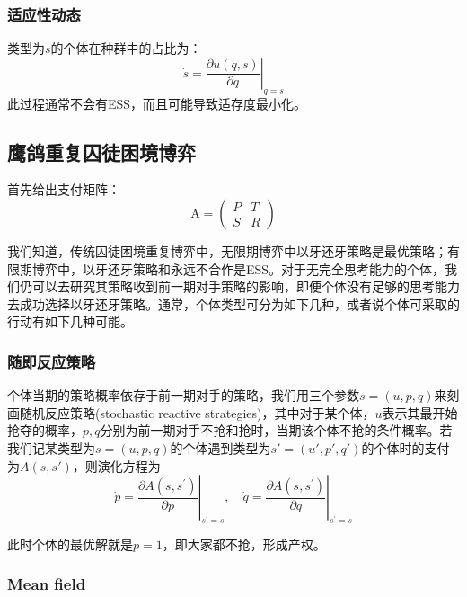 \documentclass[lang=cn,12pt,a4paper]{elegantpaper}
\begin{document}
\subsubsection{适应性动态}

类型为\(s\)的个体在种群中的占比为：
\begin{equation}
    \dot{s}=\left.\frac{\partial u(q, s)}{\partial q}\right|_{q=s}
\end{equation}
此过程通常不会有ESS，而且可能导致适存度最小化。

\subsection{鹰鸽重复囚徒困境博弈}

首先给出支付矩阵：
\begin{equation}
    \mathrm{A}=
    \begin{pmatrix}
        P&T\\S&R
    \end{pmatrix}
\end{equation}



我们知道，传统囚徒困境重复博弈中，无限期博弈中以牙还牙策略是最优策略；有限期博弈中，以牙还牙策略和永远不合作是ESS。对于无完全思考能力的个体，我们仍可以去研究其策略收到前一期对手策略的影响，即便个体没有足够的思考能力去成功选择以牙还牙策略。通常，个体类型可分为如下几种，或者说个体可采取的行动有如下几种可能。

\subsubsection{随即反应策略}

个体当期的策略概率依存于前一期对手的策略，我们用三个参数\(s=(u,p,q)\)来刻画随机反应策略(stochastic reactive strategies)，其中对于某个体，\(u\)表示其最开始抢夺的概率，\(p,q\)分别为前一期对手不抢和抢时，当期该个体不抢的条件概率。若我们记某类型为\(s=(u,p,q)\)的个体遇到类型为\(s'=(u',p',q')\)的个体时的支付为\(A(s,s')\)，则演化方程为
\begin{equation}
    \dot{p}=\left.\frac{\partial A\left(s, s^{\prime}\right)}{\partial p}\right|_{s^{\prime}=s}, \quad \dot{q}=\left.\frac{\partial A\left(s, s^{\prime}\right)}{\partial q}\right|_{s^{\prime}=s}
\end{equation}

此时个体的最优解就是\(p=1\)，即大家都不抢，形成产权。

\subsubsection{Mean field}
\end{document}

